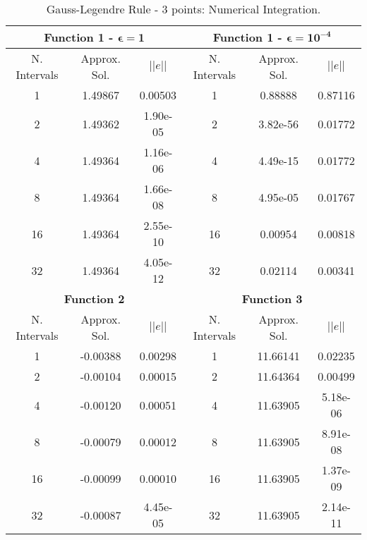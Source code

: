 \begin{table}[H]
    \centering
    \caption{Gauss-Legendre Rule - 3 points: Numerical Integration.}
    \label{tab:gauss3_int}
    \begin{tabular}{ccc|ccc}
    \hline
    \multicolumn{3}{c}{\textbf{Function 1  -} $\bm{\epsilon = 1}$} & \multicolumn{3}{c}{\textbf{Function 1 -} $\bm{\epsilon = 10^{-4}}$} \\ \hline
    N. Intervals & Approx. Sol. & $|| e ||$ & N. Intervals & Approx. Sol. & $|| e ||$ \\ \hline
    1 & 1.49867 & 0.00503 & 1 & 0.88888 & 0.87116 \\
    2 & 1.49362 & 1.90e-05 & 2 & 3.82e-56 & 0.01772 \\
    4 & 1.49364 & 1.16e-06 & 4 & 4.49e-15 & 0.01772 \\
    8 & 1.49364 & 1.66e-08 & 8 & 4.95e-05 & 0.01767 \\
    16 & 1.49364 & 2.55e-10 & 16 & 0.00954 & 0.00818  \\
    32 & 1.49364 & 4.05e-12 & 32 & 0.02114 & 0.00341 \\ \hline
    \multicolumn{3}{c}{\textbf{Function 2}} & \multicolumn{3}{c}{\bf{Function 3}} \\ \hline
    N. Intervals & Approx. Sol. & $|| e ||$ & N. Intervals & Approx. Sol. & $|| e ||$ \\ \hline
    1 & -0.00388 & 0.00298 & 1 & 11.66141&  0.02235 \\
    2 & -0.00104 & 0.00015 & 2 & 11.64364 & 0.00499 \\
    4 & -0.00120 & 0.00051 & 4 & 11.63905 & 5.18e-06 \\ 
    8 & -0.00079 & 0.00012 & 8 & 11.63905 & 8.91e-08 \\
    16 & -0.00099 & 0.00010 & 16 & 11.63905 & 1.37e-09 \\ 
    32 & -0.00087 & 4.45e-05 & 32 & 11.63905 & 2.14e-11 \\ \hline
    \end{tabular}
\end{table}
